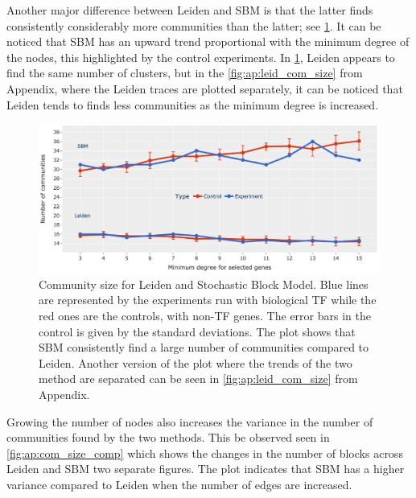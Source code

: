 Another major difference between Leiden and SBM is that the latter finds consistently considerably more communities than the latter; see \cref{fig:N_I:comp_size_com_det}. It can be noticed that SBM has an upward trend proportional with the minimum degree of the nodes, this highlighted by the control experiments. In \cref{fig:N_I:comp_size_com_det}, Leiden appears to find the same number of clusters, but in the \cref{fig:ap:leid_com_size} from Appendix, where the Leiden traces are plotted separately, it can be noticed that Leiden tends to finds less communities as the minimum degree is increased. 

\begin{figure}[!htb]   
    \centering
    \includegraphics[width=1.0\textwidth,keepaspectratio]{Sections/Network_I/Resources/selective_pruning/com_comp/sbm_Leiden_combNum.png}
      \caption[Leiden vs SBM: Number of communities found]{Community size for Leiden and Stochastic Block Model. Blue lines are represented by the experiments run with biological TF while the red ones are the controls, with non-TF genes. The error bars in the control is given by the standard deviations. The plot shows that SBM consistently find a large number of communities compared to Leiden. Another version of the plot where the trends of the two method are separated can be seen in \cref{fig:ap:leid_com_size} from Appendix.}
    \label{fig:N_I:comp_size_com_det}
\end{figure}

Growing the number of nodes also increases the variance in the number of communities found by the two methods. This be observed seen in \cref{fig:ap:com_size_comp} which shows the changes in the number of blocks across Leiden and SBM two separate figures. The plot indicates that SBM has a higher variance compared to Leiden when the number of edges are increased.

